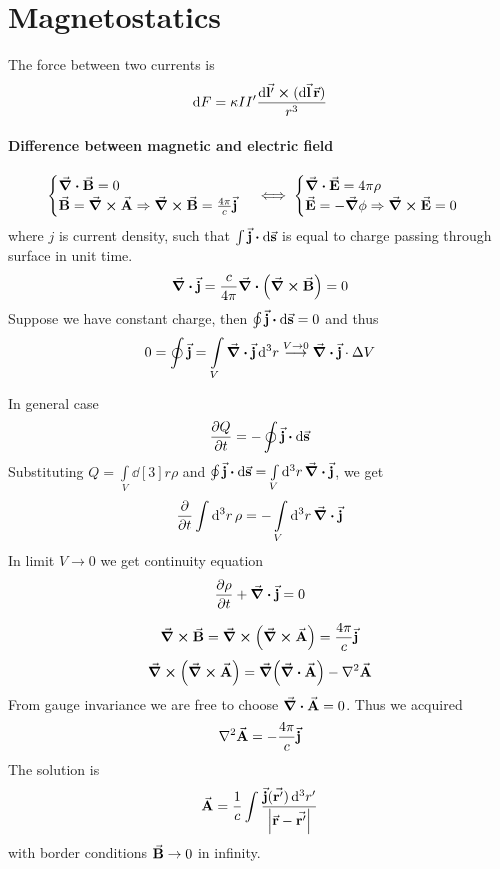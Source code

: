 \section{Magnetostatics}
The force between two currents is
$$\dd{F} = \kappa II' \frac{\dd{\va{l'}} \cross (\dd{\va{l}} \va{r})}{r^3}$$

\paragraph{Difference between magnetic and electric field}
$$\begin{cases}
\div{\va{B}}  = 0 \\
\va{B} = \curl{\va{A}} \Rightarrow \curl{\va{B}} = \frac{4\pi}{c} \va{j} 
\end{cases} \iff \begin{cases}
\div{\va{E}}  = 4\pi \rho \\
\va{E} = -\grad{\phi} \Rightarrow \curl{\va{E}} = 0
\end{cases}$$
where $j$ is current density, such that $\int \va{j} \vdot \dd{\va{s}}$ is equal to charge passing through surface in unit time.
$$\div{\va{j}} = \frac{c}{4\pi} \div(\curl{\va{B}}) = 0$$
Suppose we have constant charge, then $\oint \va{j} \vdot \dd{\va{s}} = 0$ and thus
$$0=\oint \va{j} = \int\limits_{V} \div{\va{j}} \dd[3]{r} \stackrel{V \to 0}{\longrightarrow} \div{\va{j}} \cdot \Delta V $$

In general case
$$\pdv{Q}{t} = - \oint \va{j}\vdot \dd{\va{s}}$$
Substituting $Q = \int\limits_V  \dd[3]{r} \rho$ and $ \oint \va{j}\vdot \dd{\va{s}} = \int\limits_V \dd[3]{r} \div{\va{j}} $, we get
$$\pdv{t} \int \dd[3]{r} \rho = -\int\limits_V \dd[3]{r}  \div{\va{j}} $$
In limit $V \to 0$ we get continuity equation
$$\pdv{\rho}{t} + \div{\va{j}} = 0$$

$$\curl{\va{B}} = \curl(\curl{\va{A}}) = \frac{4\pi}{c} \va{j}$$
$$\curl(\curl{\va{A}}) = \grad(\div{\va{A}}) - \laplacian{\va{A}}$$
From gauge invariance we are free to choose $\div{\va{A}} = 0$. Thus we acquired
$$\laplacian{\va{A}} = - \frac{4\pi}{c} \va{j}$$
The solution is 
$$\va{A} = \frac{1}{c} \int \frac{\va{j} (\va{r'}) \dd[3]{r'}}{\qty|\va{r} -\va{r'}|}$$
with border conditions $\va{B} \to 0$ in infinity.